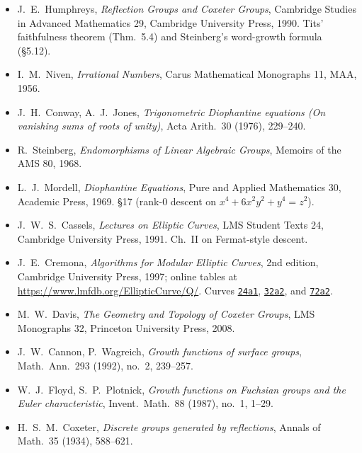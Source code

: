 \documentclass[11pt,a4paper]{article}
\theoremstyle{remark}
\theoremstyle{plain}
\begin{document}
\begin{itemize}[leftmargin=2em,itemsep=0.2em]
\item J.~E.~Humphreys, \emph{Reflection Groups and Coxeter Groups},
Cambridge Studies in Advanced Mathematics 29, Cambridge University
Press, 1990.  Tits' faithfulness theorem (Thm.~5.4) and Steinberg's
word-growth formula (\S5.12).

\item I.~M.~Niven, \emph{Irrational Numbers}, Carus Mathematical
Monographs 11, MAA, 1956.

\item J.~H.~Conway, A.~J.~Jones, \emph{Trigonometric Diophantine
equations (On vanishing sums of roots of unity)}, Acta Arith.\ 30
(1976), 229--240.

\item R.~Steinberg, \emph{Endomorphisms of Linear Algebraic Groups},
Memoirs of the AMS 80, 1968.

\item L.~J.~Mordell, \emph{Diophantine Equations}, Pure and Applied
Mathematics 30, Academic Press, 1969.  §17 (rank-$0$ descent on
$x^4 + 6 x^2 y^2 + y^4 = z^2$).

\item J.~W.~S.~Cassels, \emph{Lectures on Elliptic Curves}, LMS Student
Texts 24, Cambridge University Press, 1991.  Ch.~II on Fermat-style
descent.

\item J.~E.~Cremona, \emph{Algorithms for Modular Elliptic Curves},
2nd edition, Cambridge University Press, 1997; online tables at
\url{https://www.lmfdb.org/EllipticCurve/Q/}.  Curves
\href{https://www.lmfdb.org/EllipticCurve/Q/24/a/1}{\texttt{24a1}},
\href{https://www.lmfdb.org/EllipticCurve/Q/32/a/2}{\texttt{32a2}}, and
\href{https://www.lmfdb.org/EllipticCurve/Q/72/a/2}{\texttt{72a2}}.

\item M.~W.~Davis, \emph{The Geometry and Topology of Coxeter Groups},
LMS Monographs 32, Princeton University Press, 2008.

\item J.~W.~Cannon, P.~Wagreich, \emph{Growth functions of surface
groups}, Math.\ Ann.\ 293 (1992), no.~2, 239--257.

\item W.~J.~Floyd, S.~P.~Plotnick, \emph{Growth functions on Fuchsian
groups and the Euler characteristic}, Invent.\ Math.\ 88 (1987),
no.~1, 1--29.

\item H.~S.~M.~Coxeter, \emph{Discrete groups generated by
reflections}, Annals of Math.\ 35 (1934), 588--621.


\end{itemize}
\end{document}
